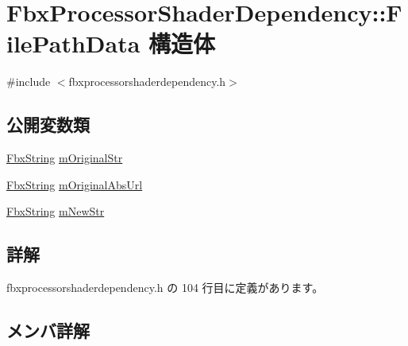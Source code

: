 \hypertarget{struct_fbx_processor_shader_dependency_1_1_file_path_data}{}\section{Fbx\+Processor\+Shader\+Dependency\+:\+:File\+Path\+Data 構造体}
\label{struct_fbx_processor_shader_dependency_1_1_file_path_data}


{\ttfamily \#include $<$fbxprocessorshaderdependency.\+h$>$}

\subsection*{公開変数類}
\begin{DoxyCompactItemize}
\item 
\hyperlink{class_fbx_string}{Fbx\+String} \hyperlink{struct_fbx_processor_shader_dependency_1_1_file_path_data_aa8e2a65dd054c34298e4c94e97e25a7d}{m\+Original\+Str}
\item 
\hyperlink{class_fbx_string}{Fbx\+String} \hyperlink{struct_fbx_processor_shader_dependency_1_1_file_path_data_a928d771cfe786eb2d62c4d01f4b39e67}{m\+Original\+Abs\+Url}
\item 
\hyperlink{class_fbx_string}{Fbx\+String} \hyperlink{struct_fbx_processor_shader_dependency_1_1_file_path_data_a18b0e38f5eb481ea90bdbf313dba9ec6}{m\+New\+Str}
\end{DoxyCompactItemize}


\subsection{詳解}


 fbxprocessorshaderdependency.\+h の 104 行目に定義があります。



\subsection{メンバ詳解}
\mbox{\label{struct_fbx_processor_shader_dependency_1_1_file_path_data_a18b0e38f5eb481ea90bdbf313dba9ec6}} 
